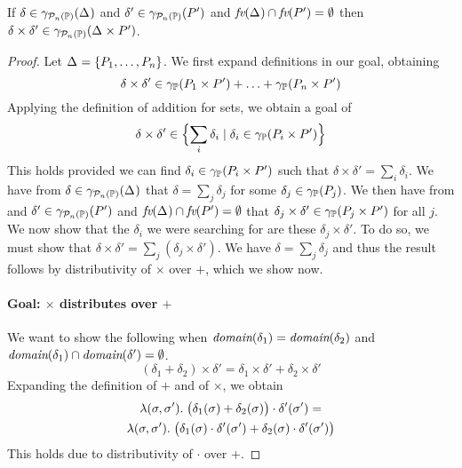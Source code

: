 \begin{lemma} \label{lem:ppp:prod}
  If $ \delta \in \gamma_{\mathcal{P}_{n}\left( \mathbb{P} \right)}(\Delta_{}) $ and $ \delta' \in
  \gamma_{\mathcal{P}_{n}\left( \mathbb{P} \right)}(P_{}') $ and $\textit{fv}(\Delta_{}) \cap \textit{fv}(P_{}') = \emptyset$ then $
  \delta \times \delta' \in \gamma_{\mathcal{P}_{n}\left( \mathbb{P} \right)}(\Delta_{} \times P_{}') $.
\end{lemma}
\begin{proof}
Let $\Delta_{} = \{P_{1},\ldots,P_{n}\}$.  We first expand definitions
in our goal, obtaining
\[\delta \times \delta' \in \gamma_{\mathbb{P}}(P_{1} \times P_{}') + \ldots + \gamma_{\mathbb{P}}(P_{n} \times P_{}')\]
Applying the definition of addition for sets, we obtain a goal of
\[\delta \times \delta' \in \Bigl\{\sum_i \delta_i \mid \delta_i \in \gamma_{\mathbb{P}}(P_{i} \times P_{}') \Bigr\}\]
This holds provided we can find $\delta_i \in \gamma_{\mathbb{P}}(P_{i} \times P_{}')$ such that $\delta \times \delta' = \sum_i \delta_i$.
We have from $\delta \in \gamma_{\mathcal{P}_{n}\left( \mathbb{P} \right)}(\Delta_{})$ that $\delta = \sum_j \delta_j$ for some $\delta_j \in \gamma_{\mathbb{P}}(P_{j})$.  We then have from  and $\delta' \in \gamma_{\mathcal{P}_{n}\left( \mathbb{P} \right)}(P_{}')$ and
$\textit{fv}(\Delta_{}) \cap \textit{fv}(P_{}') = \emptyset$ that
$\delta_j \times \delta' \in \gamma_{\mathbb{P}}(P_{j} \times P_{}')$ for all $j$.
We now show that the $\delta_i$ we were searching for are these $\delta_j \times \delta'$.
To do so, we must show that $\delta \times \delta' = \sum_j(\delta_j \times \delta')$.
We have $\delta = \sum_j \delta_j$ and thus the result follows by distributivity of $\times$
over $+$, which we show now.

\paragraph{Goal: $\times$ distributes over $+$}
We want to show the following when $\textit{domain}(\delta_1) = \textit{domain}(\delta_2)$ and $\textit{domain}(\delta_1) \cap \textit{domain}(\delta') = \emptyset$.
\[(\delta_1 + \delta_2) \times \delta' = \delta_1 \times \delta' + \delta_2 \times \delta'\]
Expanding the definition of $+$ and of $\times$, we obtain
\begin{multline*}
\lambda(\sigma, \sigma') . \; \bigl(\delta_1(\sigma) + \delta_2(\sigma)\bigr) \cdot \delta'(\sigma') =\\
\lambda(\sigma, \sigma') . \; \bigl(\delta_1(\sigma) \cdot \delta'(\sigma') +
\delta_2(\sigma) \cdot \delta'(\sigma')\bigr)
\end{multline*}
This holds due to distributivity of $\cdot$ over $+$.
\end{proof}

